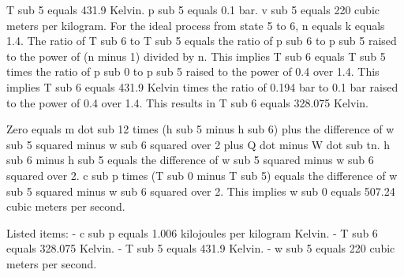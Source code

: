 T sub 5 equals 431.9 Kelvin.
p sub 5 equals 0.1 bar.
v sub 5 equals 220 cubic meters per kilogram.
For the ideal process from state 5 to 6, n equals k equals 1.4.
The ratio of T sub 6 to T sub 5 equals the ratio of p sub 6 to p sub 5 raised to the power of (n minus 1) divided by n.
This implies T sub 6 equals T sub 5 times the ratio of p sub 0 to p sub 5 raised to the power of 0.4 over 1.4.
This implies T sub 6 equals 431.9 Kelvin times the ratio of 0.194 bar to 0.1 bar raised to the power of 0.4 over 1.4.
This results in T sub 6 equals 328.075 Kelvin.

Zero equals m dot sub 12 times (h sub 5 minus h sub 6) plus the difference of w sub 5 squared minus w sub 6 squared over 2 plus Q dot minus W dot sub tn.
h sub 6 minus h sub 5 equals the difference of w sub 5 squared minus w sub 6 squared over 2.
c sub p times (T sub 0 minus T sub 5) equals the difference of w sub 5 squared minus w sub 6 squared over 2.
This implies w sub 0 equals 507.24 cubic meters per second.

Listed items:
- c sub p equals 1.006 kilojoules per kilogram Kelvin.
- T sub 6 equals 328.075 Kelvin.
- T sub 5 equals 431.9 Kelvin.
- w sub 5 equals 220 cubic meters per second.
